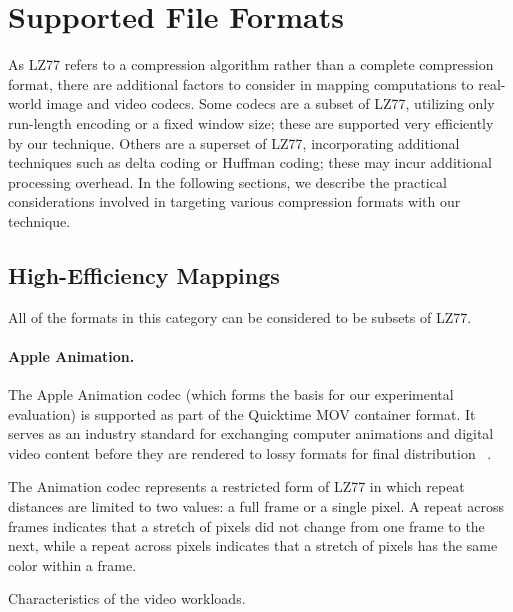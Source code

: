 \section{Supported File Formats}
\label{sec:formats}

As LZ77 refers to a compression algorithm rather than a complete
compression format, there are additional factors to consider in
mapping computations to real-world image and video codecs.  Some
codecs are a subset of LZ77, utilizing only run-length encoding or a
fixed window size; these are supported very efficiently by our
technique.  Others are a superset of LZ77, incorporating additional
techniques such as delta coding or Huffman coding; these may incur
additional processing overhead.  In the following sections, we
describe the practical considerations involved in targeting various
compression formats with our technique.

\subsection{High-Efficiency Mappings}
\label{sec:formats-good}

All of the formats in this category can be considered to be subsets of
LZ77.

\paragraph{Apple Animation.}  
The Apple Animation codec (which forms the basis for our experimental
evaluation) is supported as part of the Quicktime MOV container
format.  It serves as an industry standard for exchanging computer
animations and digital video content before they are rendered to lossy
formats for final distribution~\cite[p.~106]{adobe-anim}\cite[p.~284]{harrington-anim} \cite[p.~367]{long-anim}\cite[p.~280]{pogue-anim}.

The Animation codec represents a restricted form of LZ77 in which
repeat distances are limited to two values: a full frame or a single
pixel.  A repeat across frames indicates that a stretch of pixels did
not change from one frame to the next, while a repeat across pixels
indicates that a stretch of pixels has the same color within a frame.

\begin{table*}[t]
\vspace{-1\baselineskip}
\caption{Characteristics of the video workloads.
\protect\label{tab:videos}}
\end{table*}

